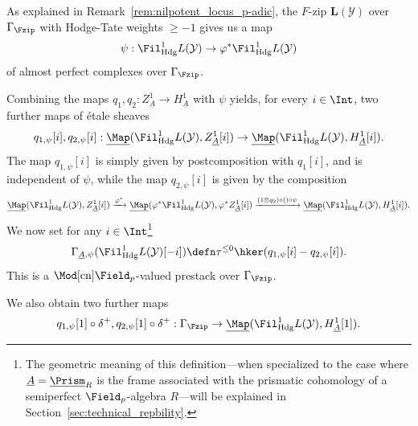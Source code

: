 \documentclass[10pt]{amsart}
\begin{document}
\begin{construction}
\label{const:defining_q1psi_q2psi}
As explained in Remark~\ref{rem:nilpotent_locus_p-adic}, the $F$-zip $\bm{L}(\mathcal{Y})$ over $\Gamma_{\Fzip}$ with Hodge-Tate weights $\ge -1$ gives us a map 
\[
\psi:\Fil^1_{\mathrm{Hdg}}L(\mathcal{Y})\to \varphi^*\Fil^1_{\mathrm{Hdg}}L(\mathcal{Y})
\]
of almost perfect complexes over $\Gamma_{\Fzip}$.

Combining the maps $q_1,q_2:Z^1_{\underline{A}}\to H^1_{\underline{A}}$ with $\psi$ yields, for every $i\in \Int$, two further maps of \'etale sheaves
\[
q_{1,\psi}[i],q_{2,\psi}[i]:\underline{\Map}(\Fil^1_{\mathrm{Hdg}}L(\mathcal{Y}),Z^1_{\underline{A}}[i])\to \underline{\Map}(\Fil^1_{\mathrm{Hdg}}L(\mathcal{Y}),H^1_{\underline{A}}[i]).
\]
The map $q_{1,\psi}[i]$ is simply given by postcomposition with $q_1[i]$, and is independent of $\psi$, while the map $q_{2,\psi}[i]$ is given by the composition 
\[
\underline{\Map}(\Fil^1_{\mathrm{Hdg}}L(\mathcal{Y}),Z^1_{\underline{A}}[i])\xrightarrow{\varphi^*}\underline{\Map}(\varphi^*\Fil^1_{\mathrm{Hdg}}L(\mathcal{Y}),\varphi^*Z^1_{\underline{A}}[i])\xrightarrow{(1\otimes q_2)\circ ()\circ \psi}\underline{\Map}(\Fil^1_{\mathrm{Hdg}}L(\mathcal{Y}),H^1_{\underline{A}}[i]).
\]
We now set for any $i\in\Int$\footnote{The geometric meaning of this definition---when specialized to the case where $\underline{A} = \underline{\Prism}_R$ is the frame associated with the prismatic cohomology of a semiperfect $\Field_p$-algebra $R$---will be explained in Section~\ref{sec:technical_repbility}.}
\[
\Gamma_{\underline{A},\psi}(\Fil^{1}_{\mathrm{Hdg}}L(\mathcal{Y})[-i]) \defn \tau^{\leq 0}\hker(q_{1,\psi}[i]-q_{2,\psi}[i]).
\]
This is a $\Mod[\mathrm{cn}]{\Field_p}$-valued prestack over $\Gamma_{\Fzip}$.

We also obtain two further maps
\[
q_{1,\psi}[1]\circ \delta^+,q_{2,\psi}[1]\circ \delta^+:\Gamma_{\Fzip}\to \underline{\Map}(\Fil^1_{\mathrm{Hdg}}L(\mathcal{Y}),H^1_{\underline{A}}[1]).
\]
\end{construction}  
\end{document}
